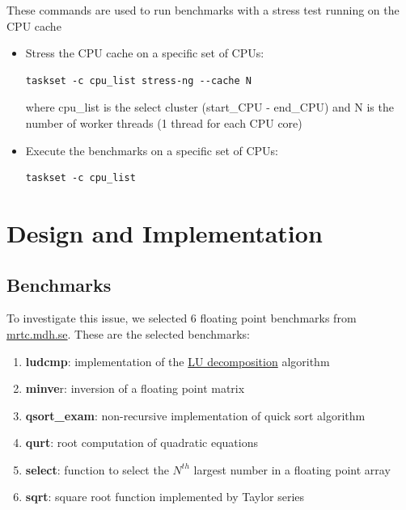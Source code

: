 These commands are used to run benchmarks with a stress test running on the CPU cache

\begin{itemize}
	\item Stress the CPU cache on a specific set of CPUs:\begin{verbatim}taskset -c cpu_list stress-ng --cache N \end{verbatim} where cpu\_list is the select cluster (start\_CPU - end\_CPU) and N is the number of worker threads (1 thread for each CPU core)
	\item Execute the benchmarks on a specific set of CPUs: \begin{verbatim}taskset -c cpu_list\end{verbatim}
\end{itemize}

\section{Design and Implementation}

\subsection{Benchmarks}

To investigate this issue, we selected 6 floating point benchmarks from \href{http://www.mrtc.mdh.se/projects/wcet/benchmarks.html}{mrtc.mdh.se}.
These are the selected benchmarks:
\begin{enumerate}
	\item \textbf{ludcmp}: implementation of the \href{https://en.wikipedia.org/wiki/LU_decomposition}{LU decomposition} algorithm
	\item \textbf{minve}r: inversion of a floating point matrix
	\item \textbf{qsort\_exam}: non-recursive implementation of quick sort algorithm
	\item \textbf{qurt}: root computation of quadratic equations
	\item \textbf{select}: function to select the ${N}^{th}$ largest number in a floating point array
	\item \textbf{sqrt}: square root function implemented by Taylor series
\end{enumerate}

